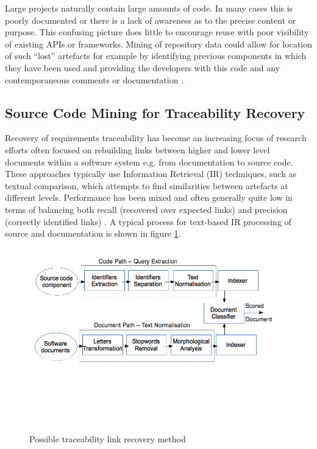 Large projects naturally contain large amounts of code. In many cases this is poorly documented or there is a lack of awareness as to the precise content or purpose. This confusing picture does little to encourage reuse with poor visibility of existing APIs or frameworks. Mining of repository data could allow for location of such ``lost'' artefacts for example by identifying previous components in which they have been used and providing the developers with this code and any contemporaneous comments or documentation \citep{hassan_road_2008}.

\subsection{Source Code Mining for Traceability Recovery}\label{lit-scm-traceability}

Recovery of requirements traceability has become an increasing focus of research efforts often focused on rebuilding links between higher and lower level documents within a software system e.g. from documentation to source code. These approaches typically use Information Retrieval (IR) techniques, such as textual comparison, which attempts to find similarities between artefacts at different levels. Performance has been mixed and often generally quite low in terms of balancing both recall (recovered over expected links) and precision (correctly identified links) \citep{ali_trustrace:_2013,antoniol_recovering_2002}. A typical process for text-based IR processing of source and documentation is shown in figure \ref{fig-lit-scm-tracerecovery}.

\begin{figure}[hbtp]
\centering
\includegraphics[scale=0.5]{sections/literature/repomining/TLR-Diagram-Antoniol}
\caption{Possible traceability link recovery method \citep{antoniol_recovering_2002}}
\label{fig-lit-scm-tracerecovery}
\end{figure}

